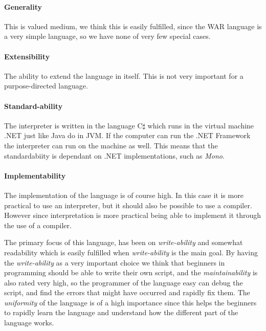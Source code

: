\paragraph{Generality} This is valued medium, we think this is easily fulfilled, since the WAR language is a very simple language, so we have none of very few special cases.

\paragraph{Extensibility} The ability to extend the language in itself. This is not very important for a purpose-directed language.

\paragraph{Standard-ability} The interpreter is written in the language C$\sharp$ which runs in the virtual machine .NET just like Java do in JVM. If the computer can run the .NET Framework the interpreter can run on the machine as well. This means that the standardabiity is dependant on .NET implementations, such as \textit{Mono}.

\paragraph{Implementability} The implementation of the language is of course high. In this case it is more practical to use an interpreter, but it should also be possible to use a compiler. However since interpretation is more practical being able to implement it through the use of a compiler.


The primary focus of this language, has been on \textit{write-ability} and somewhat readability which is easily fulfilled when \textit{write-ability} is the main goal. By having the \textit{write-ability} as a very important choice we think that beginners in programming should be able to write their own script, and the \textit{maintainability} is also rated very high, so the programmer of the language easy can debug the script, and find the errors that might have occurred and rapidly fix them. The \textit{uniformity} of the language is of a high importance since this helps the beginners to rapidly learn the language and understand how the different part of the language works.


